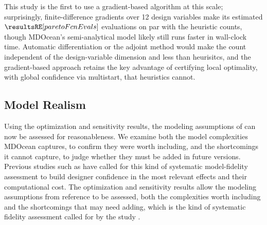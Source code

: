     This study is the first to use a gradient-based algorithm at this scale; surprisingly, finite-difference gradients over 12 design variables make its estimated $\resultsRE[paretoFcnEvals]$ evaluations on par with the heuristic counts, though MDOcean's semi-analytical model likely still runs faster in wall-clock time.
    Automatic differentiation or the adjoint method would make the count independent of the design-variable dimension and less than heurisitcs, and the gradient-based approach retains the key advantage of certifying local optimality, with global confidence via multistart, that heuristics cannot.
\fi

\subsection{Model Realism}
\ifdefined\DISSERTATION
    Using the optimization and sensitivity results, the modeling assumptions of  can now be assessed for reasonableness.
    We examine both the model complexities MDOcean captures, to confirm they were worth including, and the shortcomings it cannot capture, to judge whether they must be added in future versions.
    Previous studies such as \cite{garcia-teruel_reliability-based_2021} have called for this kind of systematic model-fidelity assessment to build designer confidence in the most relevant effects and their computational cost.
\else
    The optimization and sensitivity results allow the modeling assumptions from reference \cite{mccabe_development_2026} to be assessed, both the complexities worth including and the shortcomings that may need adding, which is the kind of systematic fidelity assessment called for by the study \cite{garcia-teruel_reliability-based_2021}.
\fi

